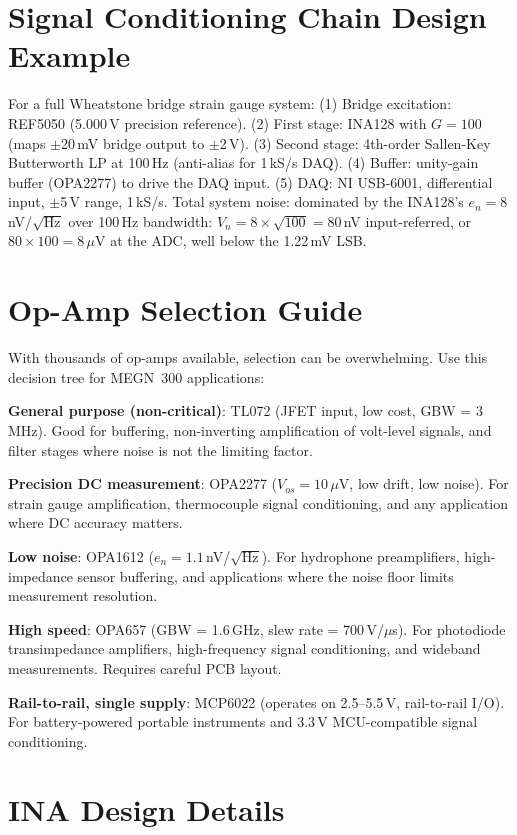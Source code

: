 \documentclass[11pt,letterpaper,twoside,openany]{book}
\begin{document}
\section{Signal Conditioning Chain Design Example}
For a full Wheatstone bridge strain gauge system: (1) Bridge excitation: REF5050 (5.000\,V precision reference). (2) First stage: INA128 with $G = 100$ (maps $\pm$20\,mV bridge output to $\pm$2\,V). (3) Second stage: 4th-order Sallen-Key Butterworth LP at 100\,Hz (anti-alias for 1\,kS/s DAQ). (4) Buffer: unity-gain buffer (OPA2277) to drive the DAQ input. (5) DAQ: NI USB-6001, differential input, $\pm$5\,V range, 1\,kS/s. Total system noise: dominated by the INA128's $e_n = 8$\,nV/$\sqrt{\text{Hz}}$ over 100\,Hz bandwidth: $V_n = 8 \times \sqrt{100} = 80$\,nV input-referred, or $80 \times 100 = 8$\,$\mu$V at the ADC, well below the 1.22\,mV LSB.
\section{Op-Amp Selection Guide}
With thousands of op-amps available, selection can be overwhelming. Use this decision tree for MEGN~300 applications:

\textbf{General purpose (non-critical)}: TL072 (JFET input, low cost, GBW = 3\,MHz). Good for buffering, non-inverting amplification of volt-level signals, and filter stages where noise is not the limiting factor.

\textbf{Precision DC measurement}: OPA2277 ($V_{os} = 10\,\mu$V, low drift, low noise). For strain gauge amplification, thermocouple signal conditioning, and any application where DC accuracy matters.

\textbf{Low noise}: OPA1612 ($e_n = 1.1$\,nV/$\sqrt{\text{Hz}}$). For hydrophone preamplifiers, high-impedance sensor buffering, and applications where the noise floor limits measurement resolution.

\textbf{High speed}: OPA657 (GBW = 1.6\,GHz, slew rate = 700\,V/$\mu$s). For photodiode transimpedance amplifiers, high-frequency signal conditioning, and wideband measurements. Requires careful PCB layout.

\textbf{Rail-to-rail, single supply}: MCP6022 (operates on 2.5--5.5\,V, rail-to-rail I/O). For battery-powered portable instruments and 3.3\,V MCU-compatible signal conditioning.

\section{INA Design Details}
\end{document}
